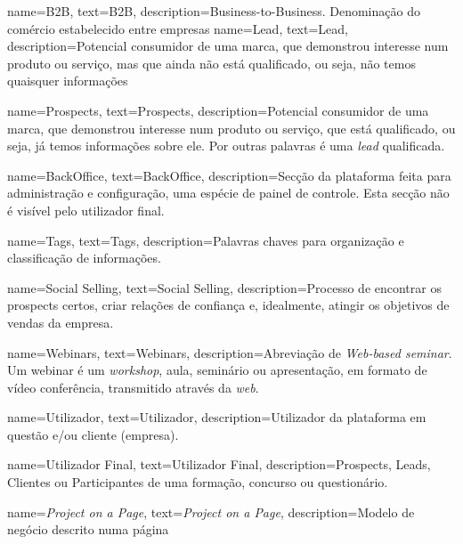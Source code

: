 {
        name=B2B,
        text=B2B,
        description={Business-to-Business. Denominação do comércio estabelecido entre empresas}
}
{
	name=Lead,
	text=Lead,
	description={Potencial consumidor de uma marca, que demonstrou interesse num produto ou serviço, mas que ainda não está qualificado, ou seja, não temos quaisquer informações}
}

{
	name=Prospects,
	text=Prospects,
	description={Potencial consumidor de uma marca, que demonstrou interesse num produto ou serviço, que está qualificado, ou seja, já temos informações sobre ele. Por outras palavras é uma \textit{lead} qualificada.}
}

{
	name=BackOffice,
	text=BackOffice,
	description={Secção da plataforma feita para administração e configuração, uma espécie de painel de controle. Esta secção não é visível pelo utilizador final. }
}

{
	name=Tags,
	text=Tags,
	description={Palavras chaves para organização e classificação de informações. }
}

{
	name=Social Selling,
	text=Social Selling,
	description={Processo de encontrar os prospects certos, criar relações de confiança e, idealmente, atingir os objetivos de vendas da empresa.}
}

{
	name=Webinars,
	text=Webinars,
	description={Abreviação de \textit{Web-based seminar}. Um webinar é um \textit{workshop}, aula, seminário ou apresentação, em formato de vídeo conferência, transmitido através da \textit{web}.}
}

{
	name=Utilizador,
	text=Utilizador,
	description={Utilizador da plataforma em questão e/ou cliente (empresa).}
}

{
	name=Utilizador Final,
	text=Utilizador Final,
	description={Prospects, Leads, Clientes ou Participantes de uma formação, concurso ou questionário.}
}

{
	name=\textit{Project on a Page},
	text=\textit{Project on a Page},
	description={Modelo de negócio descrito numa página}
}


